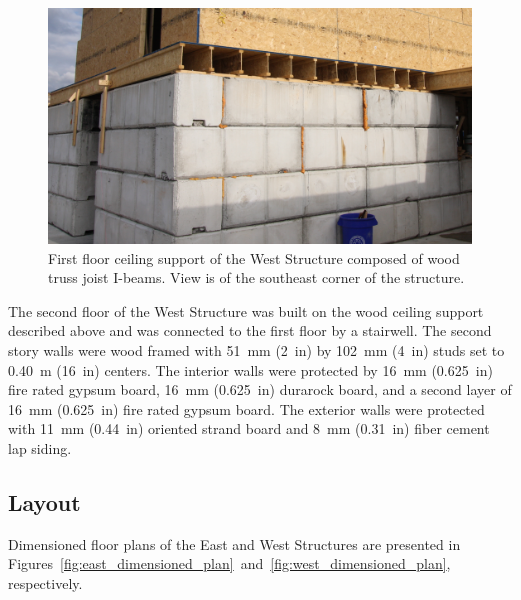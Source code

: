 \documentclass[12pt,oneside]{book}
\begin{document}
\begin{figure}[!ht]
	\includegraphics[width=6in]{../../Hose_Stream_Tests/Figures/Pictures/TJI_support}
	\caption[Ceiling support of the West Structure.]{First floor ceiling support of the West Structure composed of wood truss joist I-beams. View is of the southeast corner of the structure.}
	\label{fig:TJI}
\end{figure}
\FloatBarrier


The second floor of the West Structure was built on the wood ceiling support described above and was connected to the first floor by a stairwell. The second story walls were wood framed with 51~mm (2~in) by 102~mm (4~in) studs set to 0.40~m (16~in) centers. The interior walls were protected by 16~mm (0.625~in) fire rated gypsum board, 16~mm (0.625~in) durarock board, and a second layer of 16~mm (0.625~in) fire rated gypsum board. The exterior walls were protected with 11~mm (0.44~in) oriented strand board and 8~mm (0.31~in) fiber cement lap siding.

\subsection{Layout}
\label{sec:layout}
Dimensioned floor plans of the East and West Structures are presented in Figures~\ref{fig:east_dimensioned_plan}~and~\ref{fig:west_dimensioned_plan}, respectively.
\end{document}

